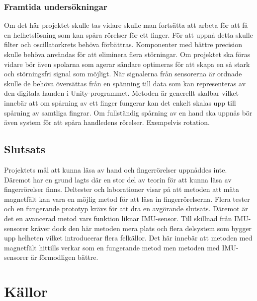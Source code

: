 \documentclass[a4paper]{article}
\makeatletter
\let\\\@raggedtwoe@savedcr%
\makeatother
\begin{document}
\begin{sloppypar}
    \subsubsection{Framtida undersökningar}
    Om det här projektet skulle tas vidare skulle man fortsätta att arbeta för att få en helhetslösning som kan spåra
    rörelser för ett finger. För att uppnå detta skulle filter och oscillatorkrets behöva förbättras. Komponenter med
    bättre precision skulle behöva användas för att eliminera flera störningar. Om projektet ska föras vidare bör även
    spolarna som agerar sändare optimeras för att skapa en så stark och störningsfri signal som möjligt.
    \\\\
    När signalerna från sensorerna är ordnade skulle de behöva översättas från en spänning till data som kan representeras
    av den digitala handen i Unity-programmet. Metoden är generellt skalbar vilket innebär att om spårning av ett finger
    fungerar kan det enkelt skalas upp till spårning av samtliga fingrar. Om fullständig spårning av en hand ska uppnås bör
    även system för att spåra handledens rörelser. Exempelvis rotation.
    \subsection{Slutsats}
    Projektets mål att kunna läsa av hand och fingerrörelser uppnåddes inte. Däremot har en grund lagts där en stor del av
    teorin för att kunna läsa av fingerrörelser finns. Deltester och laborationer visar på att metoden att mäta magnetfält
    kan vara en möjlig metod för att läsa in fingerrörelserna. Flera tester och en fungerande prototyp krävs för att dra
    en avgörande slutsats. Däremot är det en avancerad metod vars funktion liknar IMU-sensor. Till skillnad från IMU-sensorer
    kräver dock den här metoden mera plats och flera delsystem som bygger upp helheten vilket introducerar flera felkällor.
    Det här innebär att metoden med magnetfält hittills verkar som en fungerande metod men metoden med IMU-sensorer är
    förmodligen bättre.


    \newpage

    \section{Källor}
    \printbibliography[heading=none]

    \newpage
    \appendices
    \titleformat{\section}[display]
    {\normalfont\Large\bfseries}{\appendixname\enspace\thesection}{.5em}{} %




\end{sloppypar}
\end{document}

